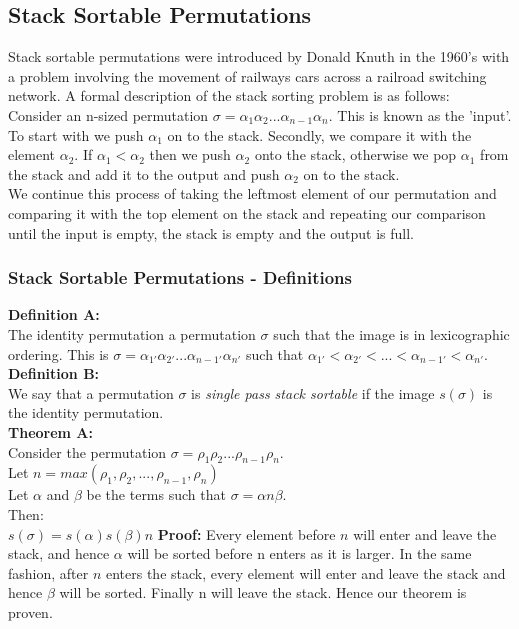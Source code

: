 \documentclass[12pt]{article}
\begin{document}
\subsection{Stack Sortable Permutations}
Stack sortable permutations were introduced by Donald Knuth in the 1960's with a problem involving the movement of railways cars across a railroad switching network. \cite{KnuthVol1} \cite{KnuthVol3}
\newline
A formal description of the stack sorting problem is as follows:\\
Consider an n-sized permutation $\sigma = \alpha_{1}\alpha_{2}...\alpha_{n-1}\alpha_{n}$. This is known as the 'input'. To start with we push $\alpha_{1}$ on to the stack. Secondly, we compare it with the element $\alpha_{2}$. If $\alpha_{1} < \alpha_{2}$ then we push $\alpha_{2}$ onto the stack, otherwise we pop $\alpha_{1}$ from the stack and add it to the output and push $\alpha_{2}$ on to the stack.\\
\newline
We continue this process of taking the leftmost element of our permutation and comparing it with the top element on the stack and repeating our comparison until the input is empty, the stack is empty and the output is full.

\subsubsection{Stack Sortable Permutations - Definitions}
{\bf Definition A:}\\
The identity permutation a permutation $\sigma$ such that the image is in lexicographic ordering. This is $\sigma = \alpha_{1'}\alpha_{2'}...\alpha_{n-1'}\alpha_{n'}$ such that $\alpha_{1'} < \alpha_{2'} < ... < \alpha_{n-1'} < \alpha_{n'}$.\\
{\bf Definition B:}\\
We say that a permutation $\sigma$ is {\it single pass stack sortable} if the image $s(\sigma)$ is the identity permutation.\\
{\bf Theorem A:}\\
Consider the permutation $\sigma = \rho_{1}\rho_{2}...\rho_{n-1}\rho_{n}$.\\
Let $n = max(\rho_{1}, \rho_{2}, ..., \rho_{n-1}, \rho_{n})$ \\
Let $\alpha$ and $\beta$ be the terms such that $\sigma = \alpha n \beta$. \\
Then:\\
			$s(\sigma) = s(\alpha)s(\beta)n$			
\newline
{\bf Proof:}
Every element before $n$ will enter and leave the stack, and hence $\alpha$ will be sorted before n enters as it is larger.
In the same fashion, after $n$ enters the stack, every element will enter and leave the stack and hence $\beta$ will be sorted.
Finally n will leave the stack. Hence our theorem is proven. \square
\end{document}
